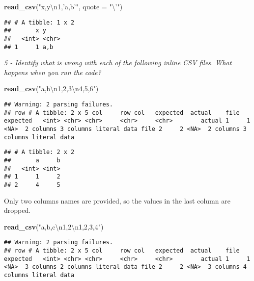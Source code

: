 \documentclass[]{article}
\newenvironment{Shaded}{\begin{snugshade}}{\end{snugshade}}
\newcommand{\KeywordTok}[1]{\textcolor[rgb]{0.13,0.29,0.53}{\textbf{#1}}}
\newcommand{\DataTypeTok}[1]{\textcolor[rgb]{0.13,0.29,0.53}{#1}}
\newcommand{\CharTok}[1]{\textcolor[rgb]{0.31,0.60,0.02}{#1}}
\newcommand{\StringTok}[1]{\textcolor[rgb]{0.31,0.60,0.02}{#1}}
\newcommand{\NormalTok}[1]{#1}
\theoremstyle{definition}
\theoremstyle{definition}
\theoremstyle{definition}
\theoremstyle{remark}
\begin{document}
\begin{Shaded}
\begin{Highlighting}[]
\KeywordTok{read_csv}\NormalTok{(}\StringTok{"x,y}\CharTok{\textbackslash{}n}\StringTok{1,'a,b'"}\NormalTok{, }\DataTypeTok{quote =} \StringTok{"}\CharTok{\textbackslash{}'}\StringTok{"}\NormalTok{)}
\end{Highlighting}
\end{Shaded}

\begin{verbatim}
## # A tibble: 1 x 2
##       x y    
##   <int> <chr>
## 1     1 a,b
\end{verbatim}

\emph{5 - Identify what is wrong with each of the following inline CSV
files. What happens when you run the code?}

\begin{Shaded}
\begin{Highlighting}[]
\KeywordTok{read_csv}\NormalTok{(}\StringTok{"a,b}\CharTok{\textbackslash{}n}\StringTok{1,2,3}\CharTok{\textbackslash{}n}\StringTok{4,5,6"}\NormalTok{)}
\end{Highlighting}
\end{Shaded}

\begin{verbatim}
## Warning: 2 parsing failures.
## row # A tibble: 2 x 5 col     row col   expected  actual    file         expected   <int> <chr> <chr>     <chr>     <chr>        actual 1     1 <NA>  2 columns 3 columns literal data file 2     2 <NA>  2 columns 3 columns literal data
\end{verbatim}

\begin{verbatim}
## # A tibble: 2 x 2
##       a     b
##   <int> <int>
## 1     1     2
## 2     4     5
\end{verbatim}

Only two columns names are provided, so the values in the last column
are dropped.

\begin{Shaded}
\begin{Highlighting}[]
\KeywordTok{read_csv}\NormalTok{(}\StringTok{"a,b,c}\CharTok{\textbackslash{}n}\StringTok{1,2}\CharTok{\textbackslash{}n}\StringTok{1,2,3,4"}\NormalTok{)}
\end{Highlighting}
\end{Shaded}

\begin{verbatim}
## Warning: 2 parsing failures.
## row # A tibble: 2 x 5 col     row col   expected  actual    file         expected   <int> <chr> <chr>     <chr>     <chr>        actual 1     1 <NA>  3 columns 2 columns literal data file 2     2 <NA>  3 columns 4 columns literal data
\end{verbatim}
\end{document}

